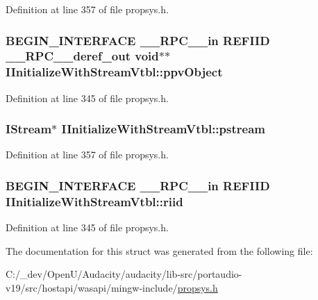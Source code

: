 Definition at line 357 of file propsys.\+h.

\subsubsection[{\texorpdfstring{ppv\+Object}{ppvObject}}]{\setlength{\rightskip}{0pt plus 5cm}B\+E\+G\+I\+N\+\_\+\+I\+N\+T\+E\+R\+F\+A\+CE {\bf \+\_\+\+\_\+\+R\+P\+C\+\_\+\+\_\+in} {\bf R\+E\+F\+I\+ID} {\bf \+\_\+\+\_\+\+R\+P\+C\+\_\+\+\_\+deref\+\_\+out} {\bf void}$\ast$$\ast$ I\+Initialize\+With\+Stream\+Vtbl\+::ppv\+Object}\hypertarget{struct_i_initialize_with_stream_vtbl_a5cf609b139ce3bbba4bf7ce7719d9569}{}\label{struct_i_initialize_with_stream_vtbl_a5cf609b139ce3bbba4bf7ce7719d9569}


Definition at line 345 of file propsys.\+h.

\subsubsection[{\texorpdfstring{pstream}{pstream}}]{\setlength{\rightskip}{0pt plus 5cm}I\+Stream$\ast$ I\+Initialize\+With\+Stream\+Vtbl\+::pstream}\hypertarget{struct_i_initialize_with_stream_vtbl_a3f9254ccbe809c949145e7166ddb7304}{}\label{struct_i_initialize_with_stream_vtbl_a3f9254ccbe809c949145e7166ddb7304}


Definition at line 357 of file propsys.\+h.

\subsubsection[{\texorpdfstring{riid}{riid}}]{\setlength{\rightskip}{0pt plus 5cm}B\+E\+G\+I\+N\+\_\+\+I\+N\+T\+E\+R\+F\+A\+CE {\bf \+\_\+\+\_\+\+R\+P\+C\+\_\+\+\_\+in} {\bf R\+E\+F\+I\+ID} I\+Initialize\+With\+Stream\+Vtbl\+::riid}\hypertarget{struct_i_initialize_with_stream_vtbl_a66afb9fdc5c7f1b5e6c7c5da707901fe}{}\label{struct_i_initialize_with_stream_vtbl_a66afb9fdc5c7f1b5e6c7c5da707901fe}


Definition at line 345 of file propsys.\+h.



The documentation for this struct was generated from the following file\+:\begin{DoxyCompactItemize}
\item 
C\+:/\+\_\+dev/\+Open\+U/\+Audacity/audacity/lib-\/src/portaudio-\/v19/src/hostapi/wasapi/mingw-\/include/\hyperlink{propsys_8h}{propsys.\+h}\end{DoxyCompactItemize}
